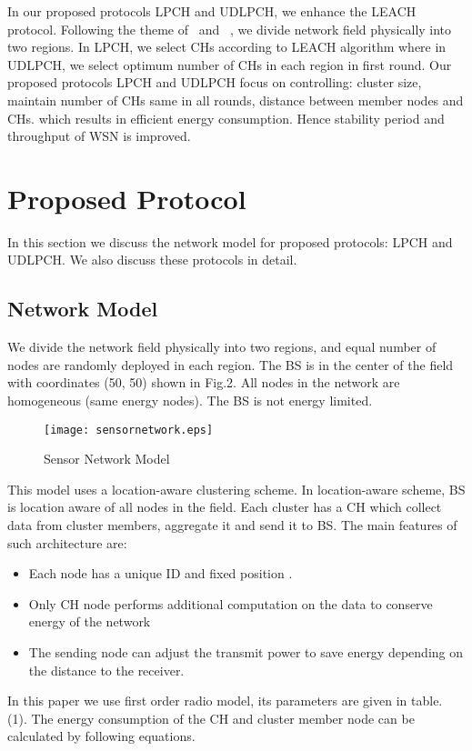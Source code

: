\documentclass[journal]{IEEEtran}
\begin{document}
In our proposed protocols LPCH and UDLPCH, we enhance the LEACH protocol. Following the theme of~\cite{R19} and ~\cite{R20}, we divide network field physically into two regions. In LPCH, we select CHs according to LEACH algorithm where in UDLPCH, we select optimum number of CHs in each region in first round. Our proposed protocols LPCH and UDLPCH focus on controlling: cluster size, maintain number of CHs same in all rounds, distance between member nodes and CHs. which results in efficient energy consumption. Hence stability period and throughput of WSN is improved.

\section{Proposed Protocol}
In this section we discuss the network model for proposed protocols: LPCH and UDLPCH. We also discuss these protocols in detail.

\subsection{Network Model}
We divide the network field physically into two regions, and equal number of nodes are randomly deployed in each region. The BS is in the center of the field with coordinates (50, 50) shown in Fig.2. All nodes in the network are homogeneous (same energy nodes). The BS is not energy limited.
\begin{figure}[h]
\centering
\texttt{[image: sensornetwork.eps]}
\caption{Sensor Network Model}
\end{figure}
This model uses a location-aware clustering scheme. In location-aware scheme, BS is location aware of all nodes in the field. Each cluster has a CH which collect data from cluster members, aggregate it and send it to BS. The main features of such architecture are:
\begin{itemize}
\item
Each node has a unique ID and fixed position .
\item
Only CH node performs additional computation on the data to conserve energy of the network
\item
The sending node can adjust the transmit power to save energy depending on the distance to the receiver.
\end{itemize}
In this paper we use first order radio model, its parameters are given in table. (1). The energy consumption of the CH  and cluster member node  can be calculated by following equations.
\end{document}
